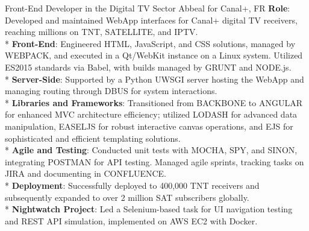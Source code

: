 \documentclass[
  a4paper,
   maincolor=cvblue,
   sectioncolor=cvblue,
]{fortysecondscv}
\begin{document}
\begin{cvtable}
    {Front-End Developer in the Digital TV Sector}
    {Abbeal for Canal+, FR}
    {
      \textbf{Role}: Developed and maintained WebApp interfaces for Canal+ digital TV receivers, reaching millions on TNT, SATELLITE, and IPTV.\\
      * \textbf{Front-End}: Engineered HTML, JavaScript, and CSS solutions, managed by WEBPACK, and executed in a Qt/WebKit instance on a Linux system. Utilized ES2015 standards via Babel, with builds managed by GRUNT and NODE.js.\\
      * \textbf{Server-Side}: Supported by a Python UWSGI server hosting the WebApp and managing routing through DBUS for system interactions.\\
      * \textbf{Libraries and Frameworks}: Transitioned from BACKBONE to ANGULAR for enhanced MVC architecture efficiency; utilized LODASH for advanced data manipulation, EASELJS for robust interactive canvas operations, and EJS for sophisticated and efficient templating solutions.\\
      * \textbf{Agile and Testing}: Conducted unit tests with MOCHA, SPY, and SINON, integrating POSTMAN for API testing. Managed agile sprints, tracking tasks on JIRA and documenting in CONFLUENCE.\\
      * \textbf{Deployment}: Successfully deployed to 400,000 TNT receivers and subsequently expanded to over 2 million SAT subscribers globally.\\
      * \textbf{Nightwatch Project}: Led a Selenium-based task for UI navigation testing and REST API simulation, implemented on AWS EC2 with Docker.\\
    }
\end{cvtable}
\end{document}
